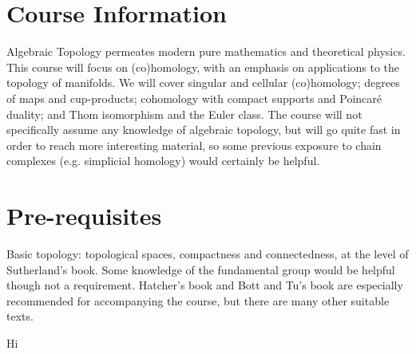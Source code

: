 \documentclass[a4paper,11pt]{article}
\begin{document}
	\maketitlepage
	\preliminaries

	\section*{Course Information}

	Algebraic Topology permeates modern pure mathematics and theoretical physics. This course will focus on (co)homology, with an emphasis on applications to the topology of manifolds. We will cover singular and cellular (co)homology; degrees of maps and cup-products; cohomology with compact supports and Poincar\'e duality; and Thom isomorphism and the Euler class. The course will not specifically assume any knowledge of algebraic topology, but will go quite fast in order to reach more interesting material, so some previous exposure to chain complexes (e.g. simplicial homology) would certainly be helpful.
	
	\section*{Pre-requisites}

	Basic topology: topological spaces, compactness and connectedness, at the level of Sutherland’s book. Some knowledge of the fundamental group would be helpful though not a requirement. Hatcher’s book and Bott and Tu’s book are especially recommended for accompanying the course, but there are many other suitable texts.

	\newpage
	\tableofcontents
	\newpage
	\maintext
	Hi
\end{document}
